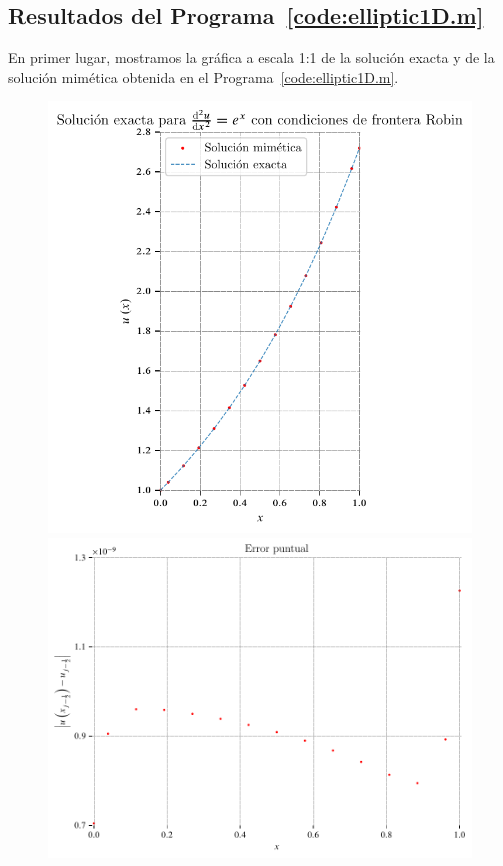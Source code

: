 \begin{problem}
\section*{Resultados del Programa~\ref{code:elliptic1D.m}}

En primer lugar, mostramos la gráfica a escala 1:1 de la solución
exacta y de la solución mimética obtenida en el Programa~\ref{code:elliptic1D.m}.

\begin{figure}[ht!]
  \centering
  \includegraphics[width=.39\paperwidth]{elliptic1D.pdf}
  \includegraphics[width=.39\paperwidth]{elliptic1Derror.pdf}

\end{figure}
\end{problem}
